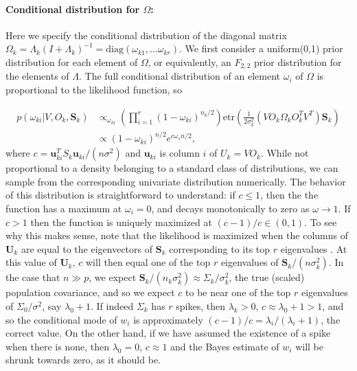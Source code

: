 \documentclass[12pt]{article}
\newcommand{\bl}[1]{{\mathbf #1}}
\newcommand{\etr}{\text{etr}}
\begin{document}
\paragraph{Conditional distribution for $\Omega$:} Here we specify the conditional
distribution of the diagonal matrix $\Omega_k =
\Lambda_k(I+\Lambda_k)^{-1} = \text{diag}(\omega_{k1}, ... \omega_{kr})$.  We first consider a uniform(0,1) prior distribution for each element of $\Omega$, or
equivalently, an $F_{2,2}$ prior distribution for the elements of
$\Lambda$.  The full conditional distribution of an
element $\omega_i$ of $\Omega$ is proportional to the likelihood
function, so

\begin{align}
p(\omega_{ki}|V, O_k, \bl S_k) &\propto_{\omega_{ki}}
  \left(\prod_{i=1}^r(1-\omega_{ki})^{n_k/2}  \right)
  \etr(\frac{1}{2\sigma_k^2}(VO_k\Omega_kO_k^TV^T)\mathbf{S}_k) \\
&  \propto  (1-\omega_{ki})^{n/2} e^{c \omega_s  n/2},    
\label{eqn:wpost}
\end{align}
%
\noindent where $c = \bl u_{ki}^T S_k \bl u_{ki}/(n \sigma^2)$ and $\bl u_{ki}$ is
column $i$ of $U_k = VO_k$.  While not proportional to a density
belonging to a standard class of distributions, we can sample from the
corresponding univariate distribution numerically.  The behavior of
this distribution is straightforward to understand: if $c\leq 1$, then
the the function has a maximum at $\omega_i =0$, and decays
monotonically to zero as $\omega \rightarrow 1$.  If $c>1$ then the
function is uniquely maximized at $(c-1)/c \in (0,1)$.  To see why
this makes sense, note that the likelihood is maximized when the
columns of $\bl U_k$ are equal to the eigenvectors of $\bl S_k$
corresponding to its top $r$ eigenvalues
\citep{Tipping1999}. At this value of $\bl U_k$, $c$ will then
equal one of the top $r$ eigenvalues of $\bl S_k/(n\sigma_k^2)$.  In the
case that $n\gg p$, we expect
$\bl S_k/(n_k\sigma_k^2)\approx \Sigma_k/\sigma_k^2$, the true (scaled)
population covariance, and so we expect $c$ to be near one of the top
$r$ eigenvalues of $\Sigma_0/\sigma^2$, say $\lambda_0+1$.  If indeed
$\Sigma_k$ has $r$ spikes, then $\lambda_k>0$,
$c \approx \lambda_0 +1 > 1$, and so the conditional mode of $w_i$ is
approximately $(c-1)/c = \lambda_i/(\lambda_i+1)$, the correct value.
On the other hand, if we have assumed the existence of a spike when
there is none, then $\lambda_0=0$, $c\approx 1$ and the Bayes estimate
of $w_i$ will be shrunk towards zero, as it should be.
\end{document}
